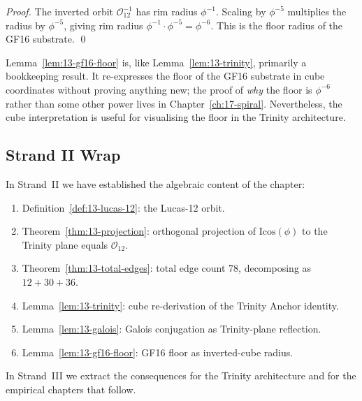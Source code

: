 \begin{proof}
The inverted orbit $\mathcal{O}_{12}^{-1}$ has rim radius
$\phi^{-1}$. Scaling by $\phi^{-5}$ multiplies the radius by
$\phi^{-5}$, giving rim radius $\phi^{-1} \cdot \phi^{-5} =
\phi^{-6}$. This is the floor radius of the GF16 substrate. \qed
\end{proof}

\begin{remark}
Lemma~\ref{lem:13-gf16-floor} is, like
Lemma~\ref{lem:13-trinity}, primarily a bookkeeping result. It
re-expresses the floor of the GF16 substrate in cube coordinates
without proving anything new; the proof of \emph{why} the floor is
$\phi^{-6}$ rather than some other power lives in
Chapter~\ref{ch:17-spiral}. Nevertheless, the cube interpretation
is useful for visualising the floor in the Trinity architecture.
\end{remark}

\subsection{Strand II Wrap}
\label{fa_13:sec:13-strand-II-wrap}

In Strand~II we have established the algebraic content of the
chapter:

\begin{enumerate}
\item Definition~\ref{def:13-lucas-12}: the Lucas-12 orbit.
\item Theorem~\ref{thm:13-projection}: orthogonal projection of
  $\mathrm{Icos}(\phi)$ to the Trinity plane equals
  $\mathcal{O}_{12}$.
\item Theorem~\ref{thm:13-total-edges}: total edge count $78$,
  decomposing as $12 + 30 + 36$.
\item Lemma~\ref{lem:13-trinity}: cube re-derivation of the
  Trinity Anchor identity.
\item Lemma~\ref{lem:13-galois}: Galois conjugation as Trinity-plane
  reflection.
\item Lemma~\ref{lem:13-gf16-floor}: GF16 floor as inverted-cube
  radius.
\end{enumerate}

In Strand~III we extract the consequences for the Trinity
architecture and for the empirical chapters that follow.


